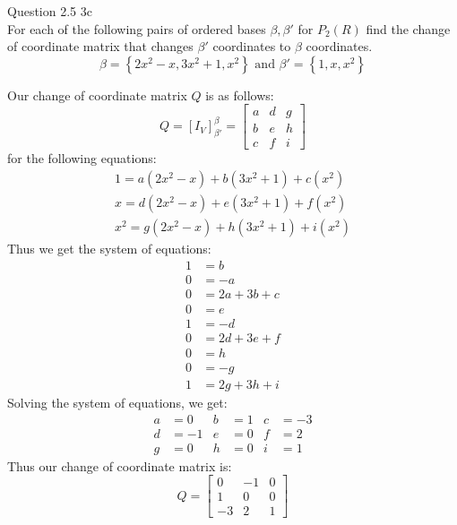 \documentclass[answers,12pt,addpoints]{exam}
\begin{document}
\begin{questions}
    \question Question 2.5 3c\\
    For each of the following pairs of ordered bases $\beta, \beta'$ for $P_2(R)$ find the change of coordinate matrix that changes $\beta'$ coordinates to $\beta$ coordinates.\\
    $$\beta = \left\{ 2x^2 -x, 3x^2 +1, x^2 \right\} \text{ and } \beta' = \left\{ 1, x, x^2\right\}$$
    \begin{solution}
        Our change of coordinate matrix $Q$ is as follows:\\
        $$Q = [I_V]_{\beta'}^\beta = \begin{bmatrix}
            a & d & g\\
            b & e & h\\
            c & f & i
        \end{bmatrix}$$
        for the following equations:
        \begin{align*}
            1 = a(2x^2 - x) + b(3x^2 + 1) + c(x^2)\\
            x = d(2x^2 - x) + e(3x^2 + 1) + f(x^2)\\
            x^2 = g(2x^2 - x) + h(3x^2 + 1) + i(x^2)
        \end{align*}
        Thus we get the system of equations:
        \begin{align*}
            1 &= b\\
            0 &= -a \\
            0 &= 2a + 3b + c\\
            0 &= e\\
            1 &= -d\\
            0 &= 2d + 3e + f\\
            0 &= h\\
            0 &= -g\\
            1 &= 2g + 3h + i
        \end{align*}
        Solving the system of equations, we get:
        \begin{align*}
            a &= 0 & b &= 1 & c &= -3\\
            d &= -1 & e &= 0 & f &= 2\\
            g &= 0 & h &= 0 & i &= 1  
        \end{align*}
        Thus our change of coordinate matrix is:
        $$Q = \begin{bmatrix}
            0 & -1 & 0\\
            1 & 0 & 0\\
            -3 & 2 & 1

\end{bmatrix}$$
\end{solution}
\end{questions}
\end{document}
